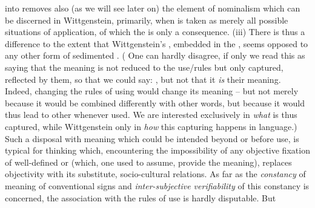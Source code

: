 {{     into  removes also (as we will see later on)
    the element of nominalism which can be discerned in Wittgenstein, primarily,
    when  is taken as merely all possible situations of application, of
    which the  is only a consequence.}  (iii) There is thus a difference
  to the extent that Wittgenstein's , embedded in the , seems opposed to any other form of sedimented .
  ( One can hardly disagree,
  if only we read this as saying that the meaning is not reduced to the
  use/rules but only captured, reflected by them, so that we could say:
  , but not that it {\em is} their
  meaning. Indeed, changing the rules of using  would change its meaning
  -- but not merely because it would be combined differently with other words,
  but because it would thus lead to other  whenever
  used.  We are
  interested exclusively in {\em what} is thus captured, while Wittgenstein only
  in {\em how} this capturing happens in language.) Such a disposal with meaning
  which could be intended beyond or before  use, is typical for
  thinking which, encountering the impossibility of any objective fixation of
  well-defined  or  (which, one used to
  assume, provide the meaning), replaces objectivity with its substitute,
  socio-cultural relations. As far as the {\em constancy} of meaning of
  conventional signs and {\em inter-subjective verifiability} of this constancy
  is concerned, the association with the rules of use is hardly disputable. But
}
